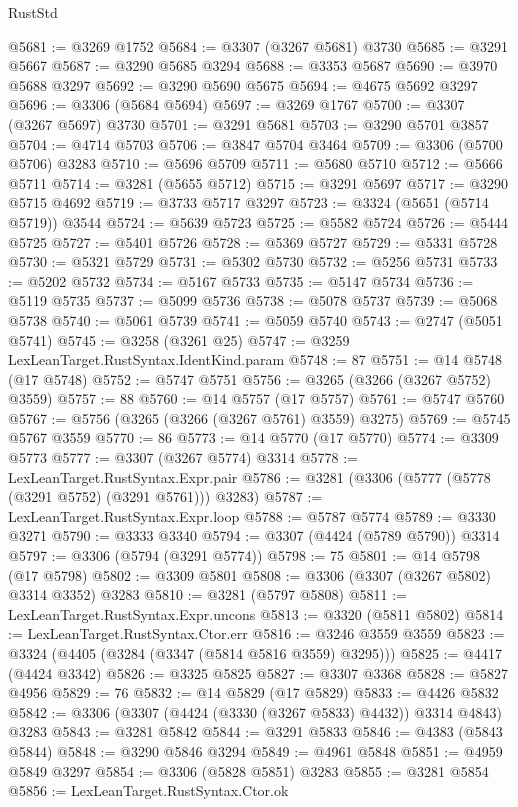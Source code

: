 \begin{lexlean}{RustStd}
\begin{coremodule}
@5681 := @3269 @1752
@5684 := @3307 (@3267 @5681) @3730
@5685 := @3291 @5667
@5687 := @3290 @5685 @3294
@5688 := @3353 @5687
@5690 := @3970 @5688 @3297
@5692 := @3290 @5690 @5675
@5694 := @4675 @5692 @3297
@5696 := @3306 (@5684 @5694)
@5697 := @3269 @1767
@5700 := @3307 (@3267 @5697) @3730
@5701 := @3291 @5681
@5703 := @3290 @5701 @3857
@5704 := @4714 @5703
@5706 := @3847 @5704 @3464
@5709 := @3306 (@5700 @5706) @3283
@5710 := @5696 @5709
@5711 := @5680 @5710
@5712 := @5666 @5711
@5714 := @3281 (@5655 @5712)
@5715 := @3291 @5697
@5717 := @3290 @5715 @4692
@5719 := @3733 @5717 @3297
@5723 := @3324 (@5651 (@5714 @5719)) @3544
@5724 := @5639 @5723
@5725 := @5582 @5724
@5726 := @5444 @5725
@5727 := @5401 @5726
@5728 := @5369 @5727
@5729 := @5331 @5728
@5730 := @5321 @5729
@5731 := @5302 @5730
@5732 := @5256 @5731
@5733 := @5202 @5732
@5734 := @5167 @5733
@5735 := @5147 @5734
@5736 := @5119 @5735
@5737 := @5099 @5736
@5738 := @5078 @5737
@5739 := @5068 @5738
@5740 := @5061 @5739
@5741 := @5059 @5740
@5743 := @2747 (@5051 @5741)
@5745 := @3258 (@3261 @25)
@5747 := @3259 LexLeanTarget.RustSyntax.IdentKind.param
@5748 := 87
@5751 := @14 @5748 (@17 @5748)
@5752 := @5747 @5751
@5756 := @3265 (@3266 (@3267 @5752) @3559)
@5757 := 88
@5760 := @14 @5757 (@17 @5757)
@5761 := @5747 @5760
@5767 := @5756 (@3265 (@3266 (@3267 @5761) @3559) @3275)
@5769 := @5745 @5767 @3559
@5770 := 86
@5773 := @14 @5770 (@17 @5770)
@5774 := @3309 @5773
@5777 := @3307 (@3267 @5774) @3314
@5778 := LexLeanTarget.RustSyntax.Expr.pair
@5786 := @3281 (@3306 (@5777 (@5778 (@3291 @5752) (@3291 @5761))) @3283)
@5787 := LexLeanTarget.RustSyntax.Expr.loop
@5788 := @5787 @5774
@5789 := @3330 @3271
@5790 := @3333 @3340
@5794 := @3307 (@4424 (@5789 @5790)) @3314
@5797 := @3306 (@5794 (@3291 @5774))
@5798 := 75
@5801 := @14 @5798 (@17 @5798)
@5802 := @3309 @5801
@5808 := @3306 (@3307 (@3267 @5802) @3314 @3352) @3283
@5810 := @3281 (@5797 @5808)
@5811 := LexLeanTarget.RustSyntax.Expr.uncons
@5813 := @3320 (@5811 @5802)
@5814 := LexLeanTarget.RustSyntax.Ctor.err
@5816 := @3246 @3559 @3559
@5823 := @3324 (@4405 (@3284 (@3347 (@5814 @5816 @3559) @3295)))
@5825 := @4417 (@4424 @3342)
@5826 := @3325 @5825
@5827 := @3307 @3368
@5828 := @5827 @4956
@5829 := 76
@5832 := @14 @5829 (@17 @5829)
@5833 := @4426 @5832
@5842 := @3306 (@3307 (@4424 (@3330 (@3267 @5833) @4432)) @3314 @4843) @3283
@5843 := @3281 @5842
@5844 := @3291 @5833
@5846 := @4383 (@5843 @5844)
@5848 := @3290 @5846 @3294
@5849 := @4961 @5848
@5851 := @4959 @5849 @3297
@5854 := @3306 (@5828 @5851) @3283
@5855 := @3281 @5854
@5856 := LexLeanTarget.RustSyntax.Ctor.ok

\end{coremodule}
\end{lexlean}
